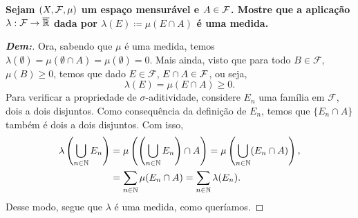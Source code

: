 \localtableofcontents
{}
\myexe{\thedois}
\bigline
\textbf{Sejam $(X, \mathcal F, \mu)$ um espaço mensurável e $A \in \mathcal F$. 
Mostre que a aplicação $\lambda: \mathcal F \rightarrow \overline {\mathbb R}$ dada por 
$\lambda(E)\coloneq \mu(E \cap A)$ é uma medida.}
\begin{proof}[\textbf{Dem:}]
Ora, sabendo que $\mu$ é uma medida, temos 
$\lambda(\emptyset) = \mu(\emptyset \cap A) = \mu(\emptyset) = 0$. Mais ainda, 
visto que para todo $B \in \mathcal F$, $\mu(B) \ge 0$, temos que dado $E \in \mathcal F$,
$E \cap A \in \mathcal F$, ou seja, 
$$\lambda(E) = \mu(E \cap A) \ge 0.$$ 
Para verificar a propriedade de $\sigma$-aditividade, considere ${E_n}$ uma família em 
$\mathcal F$, dois a dois disjuntos. Como consequência da definição de ${E_n}$, temos que 
$\{E_n \cap A\}$ também é dois a dois disjuntos. Com isso,
\begin{align*}
   \lambda\left(\bigcup\limits_{n \in \mathbb N} E_n\right) &= 
   \mu\left(\left(\bigcup\limits_{n \in \mathbb N} E_n\right)\cap A\right) = 
   \mu\left(\bigcup\limits_{n \in \mathbb N} (E_n \cap A)\right),\\
   &=\sum_{n \in \mathbb N}\mu(E_n \cap A)=\sum_{n\in\mathbb N}\lambda(E_n).
\end{align*}
Desse modo, segue que $\lambda$ é uma medida, como queríamos.
\end{proof}
\biglinend

